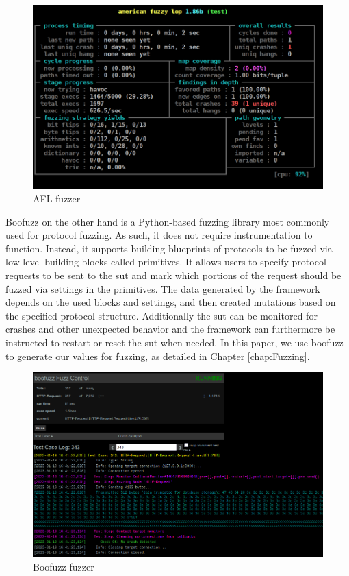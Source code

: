 \begin{figure}
	\centering
	\includegraphics[width=0.7\linewidth]{images/American_fuzzy_lop's_afl-fuzz_running_on_a_test_program}
	\caption{AFL fuzzer}
	\label{fig:americanfuzzylopsafl-fuzzrunningonatestprogram}
\end{figure}

Boofuzz on the other hand is a Python-based fuzzing library most commonly used for protocol fuzzing. As such, it does not require instrumentation to function. Instead, it supports building blueprints of protocols to be fuzzed via low-level building blocks called primitives. It allows users to specify protocol requests to be sent to the \ac{sut} and mark which portions of the request should be fuzzed via settings in the primitives. The data generated by the framework depends on the used blocks and settings, and then created mutations based on the specified protocol structure. Additionally the \ac{sut} can be monitored for crashes and other unexpected behavior and the framework can furthermore be instructed to restart or reset the \ac{sut} when needed. In this paper, we use boofuzz to generate our values for fuzzing, as detailed in Chapter \ref{chap:Fuzzing}.

\begin{figure}
	\centering
	\includegraphics[width=0.7\linewidth]{images/boofuzz_control_center}
	\caption{Boofuzz fuzzer}
	\label{fig:boofuzzcontrolcenter}
\end{figure}

